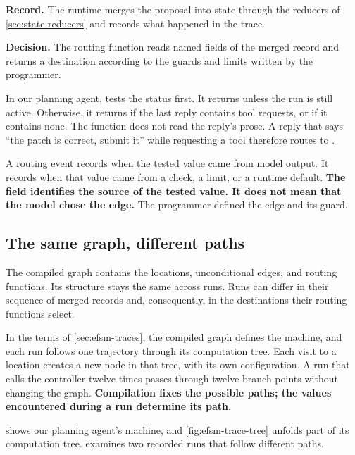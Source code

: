 \item \textbf{Record.} The runtime merges the proposal into state through the reducers of
\cref{sec:state-reducers} and records what happened in the trace.

\item \textbf{Decision.} The routing function reads named fields of the merged record and returns a
destination according to the guards and limits written by the programmer.

\ei

In our planning agent,  tests the status first. It returns  unless
the run is still active. Otherwise, it returns  if the last reply contains tool
requests, or  if it contains none. The function does not read the reply's prose.
A reply that says ``the
patch is correct, submit it'' while requesting a tool therefore routes to .

A routing event records  when the tested value came from model output. It
records  when that value came from a check, a limit, or a runtime default.
\textbf{The field identifies the source of the tested value. It does not mean that the model chose
the edge.} The programmer defined the edge and its guard.

\subsection{The same graph, different paths}
\label{sec:control-paths}

The compiled graph contains the locations, unconditional edges, and routing functions. Its
structure stays the same across runs. Runs can differ in their sequence of merged records and,
consequently, in the destinations their routing functions select.

In the terms of \cref{sec:efsm-traces}, the compiled graph defines the machine, and each run follows
one trajectory through its computation tree. Each visit to a location creates a new node in that
tree, with its own configuration. A run that calls the controller twelve times passes through
twelve branch points without changing the graph. \textbf{Compilation fixes the possible paths;
the values encountered during a run determine its path.}

 shows our planning agent's machine, and \cref{fig:efsm-trace-tree} unfolds part of
its computation tree.  examines two recorded runs that follow different paths.

